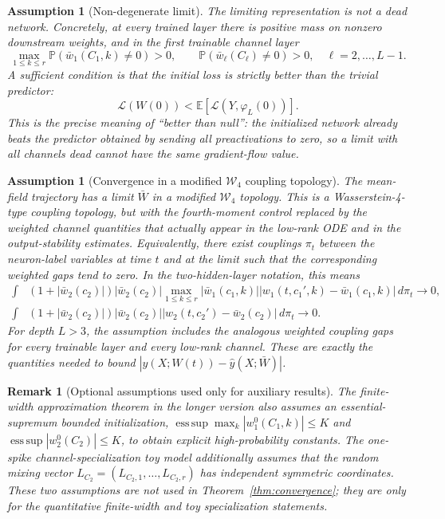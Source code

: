 \documentclass{article}
\newtheorem{assumption}[theorem]{Assumption}
\newtheorem{remark}[theorem]{Remark}
\newcommand{\E}{\mathbb{E}}
\newcommand{\Pp}{\mathbb{P}}
\newcommand{\calL}{\mathcal{L}}
\newcommand{\scrL}{\mathcal{L}}
\begin{document}
\begin{assumption}[Non-degenerate limit]
\label{assump:lr}
The limiting representation is not a dead network. Concretely, at every trained layer there is positive mass on nonzero downstream weights, and in the first trainable channel layer
\begin{equation}
\max_{1\le k\le r}\Pp(\bar w_1(C_1,k)\ne0)>0,
\qquad
\Pp(\bar w_\ell(C_\ell)\ne0)>0,\quad \ell=2,\ldots,L-1.
\end{equation}
A sufficient condition is that the initial loss is strictly better than the trivial predictor:
\begin{equation}
\scrL(W(0))<
\E\!\left[\calL\left(Y,\varphi_L(0)\right)\right].
\end{equation}
This is the precise meaning of ``better than null'': the initialized network already beats the predictor obtained by sending all preactivations to zero, so a limit with all channels dead cannot have the same gradient-flow value.
\end{assumption}

\begin{assumption}[Convergence in a modified $\mathcal W_4$ coupling topology]
\label{assump:convergence}
The mean-field trajectory has a limit $\bar W$ in a modified $\mathcal W_4$ topology. This is a Wasserstein-4-type coupling topology, but with the fourth-moment control replaced by the weighted channel quantities that actually appear in the low-rank ODE and in the output-stability estimates. Equivalently, there exist couplings $\pi_t$ between the neuron-label variables at time $t$ and at the limit such that the corresponding weighted gaps tend to zero. In the two-hidden-layer notation, this means
\begin{align}
\int &(1+|\bar w_2(c_2)|)|\bar w_2(c_2)|
\max_{1\le k\le r}|\bar w_1(c_1,k)|
|w_1(t,c_1',k)-\bar w_1(c_1,k)|\,d\pi_t
\to0,
\label{eq:conv-w1-neurips}\\
\int &(1+|\bar w_2(c_2)|)|\bar w_2(c_2)|
|w_2(t,c_2')-\bar w_2(c_2)|\,d\pi_t
\to0.
\label{eq:conv-w2-neurips}
\end{align}
For depth $L>3$, the assumption includes the analogous weighted coupling gaps for every trainable layer and every low-rank channel. These are exactly the quantities needed to bound $|\hat y(X;W(t))-\hat y(X;\bar W)|$.
\end{assumption}

\begin{remark}[Optional assumptions used only for auxiliary results]
\label{rem:aux-assumptions}
The finite-width approximation theorem in the longer version also assumes an essential-supremum bounded initialization, $\operatorname*{ess\,sup}\max_k|w_1^0(C_1,k)|\le K$ and $\operatorname*{ess\,sup}|w_2^0(C_2)|\le K$, to obtain explicit high-probability constants. The one-spike channel-specialization toy model additionally assumes that the random mixing vector $L_{C_2}=(L_{C_2,1},\ldots,L_{C_2,r})$ has independent symmetric coordinates. These two assumptions are not used in Theorem~\ref{thm:convergence}; they are only for the quantitative finite-width and toy specialization statements.
\end{remark}
\end{document}
